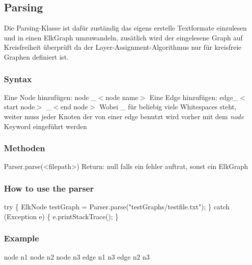 



\subsection*{Parsing}
Die Parsing-Klasse ist dafür zuständig das eigens erstelle Textformate einzulesen
und in einen ElkGraph umzuwandeln, zusätlich wird der eingelesene Graph auf Kreisfreiheit überprüft
da der Layer-Assignment-Algorithmus nur für kreisfreie Graphen definiert ist.

\subsubsection*{Syntax}
Eine Node hinzufügen:
\newline
\tab[0.5cm]  node \_$<$node name$>$
\newline
\newline
Eine Edge hinzufügen:\newline
\tab[0.5cm]  edge\_$<$start node$>$ \_$<$end node$>$
\newline
Wobei \_ für beliebig viele Whitespaces steht,
weiter muss jeder Knoten der von einer edge benutzt wird vorher mit dem \textit{node} Keyword eingeführt werden

\subsubsection*{Methoden}
Parser.parse(<filepath>)\newline
Return: null falls ein fehler auftrat, sonst ein ElkGraph

\subsubsection*{How to use the parser}
try 
\{\newline
ElkNode testGraph = Parser.parse("testGraphs/testfile.txt");
\newline
\}
\newline
catch (Exception e)
\newline
\{
\newline
  e.printStackTrace(); 
\newline
\}


\subsubsection*{Example}
node n1 \newline
node n2 \newline
node n3 \newline
\newline
\newline
edge n1 n3\newline 
edge n2 n3 \newline









